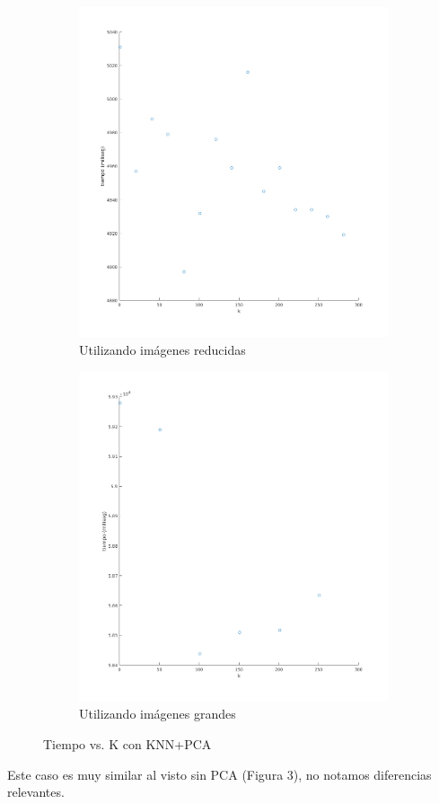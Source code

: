 \begin{figure}[H]
\begin{subfigure}[h]{0.62\linewidth}
\includegraphics[width=\linewidth]{img/k_pca_tiempo.png}
\caption{Utilizando imágenes reducidas}
\end{subfigure}
\hfill
\begin{subfigure}[h]{0.62\linewidth}
\includegraphics[width=\linewidth]{img/big_k_pca_tiempo.png}
\caption{Utilizando imágenes grandes}
\end{subfigure}%
\caption{Tiempo vs. K con KNN+PCA}
\end{figure}
Este caso es muy similar al visto sin PCA (Figura 3), no notamos diferencias relevantes.

